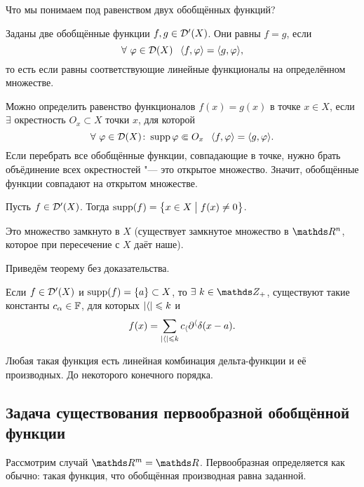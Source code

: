 Что мы понимаем под равенством двух обобщённых функций?
\begin{Def}
Заданы две обобщённые функции $f,g\in\mathcal D'(X)$. Они равны $f=g$, если
\[
  \forall\ \phi\in\D(X)\pau \la f,\phi\ra = \la g,\phi\ra,
\]
то есть если равны соответствующие линейные функционалы на определённом множестве.

Можно определить равенство функционалов $f(x)=g(x)$ в точке $x\in X$, если $\exists$ окрестность $O_x\subset X$ точки $x$, для которой
\[
  \forall\ \varphi\in \mathcal D(X)\colon \operatorname{supp} \varphi\Subset O_x\hskip .75em plus.1em minus.08em\relax \langle f,\varphi\rangle = \langle g,\varphi\rangle.
\]
Если перебрать все обобщённые функции, совпадающие в точке, нужно брать объёдинение всех окрестностей "--- это открытое множество. Значит, обобщённые функции совпадают на открытом множестве.
\end{Def}

\begin{Def}
 Пусть $f\in\mathcal D'(X)$. Тогда $\operatorname{supp}(f) = \big\{x\in X\bigm|f(x)\ne0\big\}$.
\end{Def}
Это множество замкнуто в $X$ (существует замкнутое множество в $\R^n$, которое при пересечение с $X$ даёт наше).

Приведём теорему без доказательства.
\begin{The}
  Если $f\in\mathcal D'(X)$ и $\operatorname{supp}(f) = \{a\}\subset X$, то $\exists\ k\in\Z_+$, существуют такие константы $c_\alpha\in\mathbb F$, для которых $|\langle|\leqslant k$ и
\[
  f(x) = \sum\limits_{|\langle|\leqslant k}c_\langle\partial^\langle\delta(x-a).
\]
\end{The}
Любая такая функция есть линейная комбинация дельта-функции и её производных. До некоторого конечного порядка.


\subsection{Задача существования первообразной обобщённой функции}
Рассмотрим случай $\R^m=\R$. Первообразная определяется как обычно: такая функция, что обобщённая производная равна заданной.

